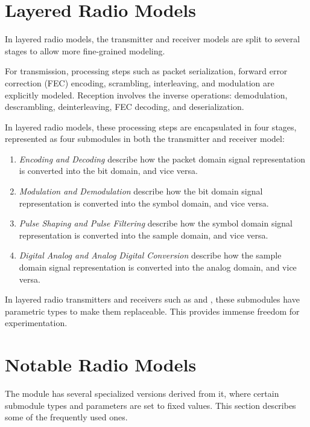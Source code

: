 \section{Layered Radio Models}

In layered radio models, the transmitter and receiver models are split
to several stages to allow more fine-grained modeling. 

For transmission, processing steps such as packet serialization, 
forward error correction (FEC) encoding, scrambling, interleaving, and 
modulation are explicitly modeled. Reception involves the inverse
operations: demodulation, descrambling, deinterleaving, 
FEC decoding, and deserialization.

In layered radio models, these processing steps are encapsulated
in four stages, represented as four submodules in both the 
transmitter and receiver model: 

\begin{enumerate}
  \item \textit{Encoding and Decoding} describe how the packet domain 
    signal representation is converted into the bit domain, and vice versa.
  \item \textit{Modulation and Demodulation} describe how the bit domain
    signal representation is converted into the symbol domain, and vice versa.
  \item \textit{Pulse Shaping and Pulse Filtering} describe how the 
    symbol domain signal representation is converted into the sample domain, 
    and vice versa.
  \item \textit{Digital Analog and Analog Digital Conversion} describe 
    how the sample domain signal representation is converted into the 
    analog domain, and vice versa.
\end{enumerate}

In layered radio transmitters and receivers such as 
and , these submodules have parametric
types to make them replaceable. This provides immense freedom for 
experimentation.

\section{Notable Radio Models}

The  module has several specialized versions derived
from it, where certain submodule types and parameters are set to fixed values.
This section describes some of the frequently used ones.

